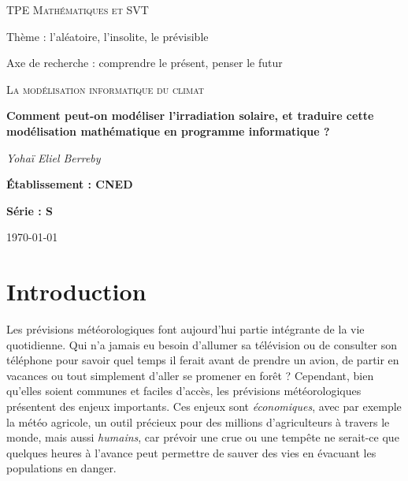 \documentclass[12pt]{article}
\begin{document}

\begin{titlepage}
	\centering
	
	{\scshape\large TPE Mathématiques et SVT\par}
	\vspace{0.2cm}	
	{ \Large Thème : l'aléatoire, l'insolite, le prévisible\par }
	{ \large Axe de recherche : comprendre le présent, penser le futur\par }
	\vspace{1.5cm}

	{\scshape\LARGE La modélisation informatique du climat \par}
	\vspace{1cm}
	{\huge\bfseries Comment peut-on modéliser l'irradiation solaire, et traduire cette modélisation mathématique en programme informatique ?\par}

	\vspace{1cm}
	{\Large\itshape Yohaï Eliel Berreby\par}
	
	\vfill
	
	
	{\Large\bfseries Établissement : CNED\par}
	\vspace{0.2cm}
	{\Large \bfseries Série : S }

	\vfill

	{\large \today\par}
\end{titlepage}


\clearpage
\tableofcontents{}
\clearpage


\section{Introduction} 

Les prévisions météorologiques font aujourd'hui partie intégrante de la vie quotidienne.
Qui n'a jamais eu besoin d'allumer sa télévision ou de consulter son téléphone pour savoir quel temps il ferait avant de prendre un avion, de partir en vacances ou tout simplement d'aller se promener en forêt ?
Cependant, bien qu'elles soient communes et faciles d'accès, les prévisions météorologiques présentent des enjeux importants.
Ces enjeux sont \emph{économiques}, avec par exemple la météo agricole, un outil précieux pour des millions d'agriculteurs à travers le monde, mais aussi \emph{humains}, car prévoir une crue ou une tempête ne serait-ce que quelques heures à l'avance peut permettre de sauver des vies en évacuant les populations en danger.
\end{document}
